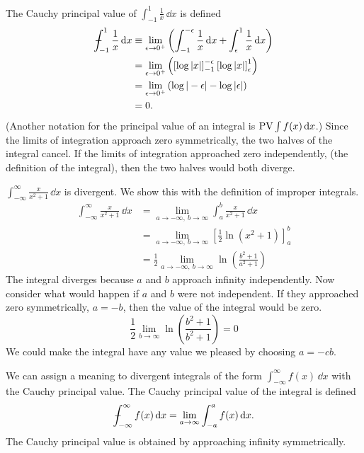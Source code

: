 The Cauchy principal value of $\int_{-1}^1 \frac{1}{x} \,\dd x$ is defined
\begin{align*}
  - \negthickspace \negthickspace \negthickspace \negmedspace \int_{-1}^1 \frac{1}{x} \,\mathrm{d} x 
  &\equiv \lim_{\epsilon \to 0^+} \left( \int_{-1}^{-\epsilon} 
    \frac{1}{x} \,\mathrm{d} x + \int_\epsilon^1 \frac{1}{x} \,\mathrm{d} x \right) \\
  &= \lim_{\epsilon \to 0^+} \left( 
    \left[ \log |x| \right]_{-1}^{-\epsilon}
    \left[ \log |x| \right]_\epsilon^1 \right) \\
  &= \lim_{\epsilon \to 0^+} \left( \log |-\epsilon| -
    \log | \epsilon | \right) \\
  &= 0.
\end{align*}
(Another notation for the principal value of an integral is
$\mathop{\mathrm{PV}}\nolimits \int f(x)\,\mathrm{d} x$.)
Since the limits of integration approach zero symmetrically, the two halves
of the integral cancel.  If the limits of integration approached
zero independently, (the definition of the integral), then the two halves
would  both diverge.






\begin{Example}
  $\int_{-\infty}^\infty \frac{x}{x^2 + 1} \,\dd x$ is divergent.  
  We show this with the definition of improper integrals.
  \begin{align*}
    \int_{-\infty}^\infty \frac{x}{x^2 + 1} \,\dd x
    &= \lim_{a \to -\infty,\ b \to \infty} \int_a^b \frac{x}{x^2 + 1} \,\dd x \\
    &= \lim_{a \to -\infty,\ b \to \infty} \left[ \frac{1}{2} \ln(x^2+1) \right]_a^b \\
    &= \frac{1}{2} \lim_{a \to -\infty,\ b \to \infty} \ln \left( \frac{b^2+1}{a^2+1} \right)
  \end{align*}
  The integral diverges because $a$ and $b$ approach infinity independently.
  Now consider what would happen if $a$ and $b$ were not independent.
  If they approached zero symmetrically, $a = -b$, then the value 
  of the integral would be zero.
  \[
  \frac{1}{2} \lim_{b \to \infty} \ln \left( \frac{b^2+1}{b^2+1} \right) = 0
  \]
  We could make the integral have any value we pleased by choosing $a = - c b$.
\end{Example}



We can assign a meaning to divergent integrals of the form
$\int_{-\infty}^\infty f(x) \,\dd x$ with the Cauchy principal value.
The Cauchy principal value of the integral is defined
\[
- \negthickspace \negthickspace \negthickspace \negmedspace \int_{-\infty}^\infty f(x) \,\mathrm{d} x = \lim_{a \to \infty} \int_{-a}^a f(x) \,\mathrm{d} x.
\]
The Cauchy principal value is obtained by approaching infinity
symmetrically.

